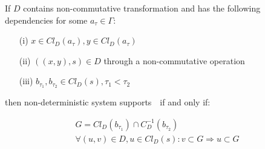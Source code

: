 \begin{theorem}
\label{necessary_conditions}
If $D$ contains non-commutative transformation and has the following dependencies for some $a_\tau \in \Gamma$:

\begin{enumerate}
  \item[(i)] $x \in Cl_D(a_\tau), y \in Cl_D(a_\tau)$
  \item[(ii)] $((x,y),s)\in D$ through a non-commutative operation
  \item[(iii)] $b_{\tau_1}, b_{\tau_2} \in Cl_D(s), \tau_1 < \tau_2$
\end{enumerate}

\noindent then non-deterministic system supports~\eo\ if and only if:

\begin{equation}
\label{theorem_conditions}
  \begin{gathered}
    G = Cl_D(b_{\tau_1}) \cap C_D^{-1}(b_{\tau_2}) \\
    \forall (u, v) \in D, u \in Cl_D(s): v \subset G \Rightarrow u \subset G
  \end{gathered}
\end{equation}

\end{theorem}
